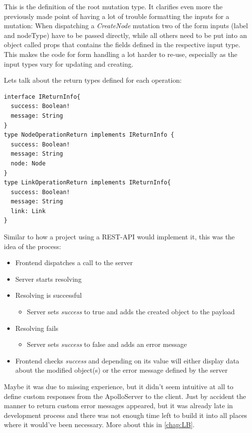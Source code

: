 This is the definition of the root mutation type. It clarifies even more the previously made point of having a lot of trouble formatting the inputs for a mutation: When dispatching a \emph{CreateNode} mutation two of the form inputs (label and nodeType) have to be passed directly, while all others need to be put into an object called props that contains the fields defined in the respective input type. This makes the code for form handling a lot harder to re-use, especially as the input types vary for updating and creating.

\newpage
Lets talk about the return types defined for each operation:
\begin{lstlisting}[caption={Return Types}]
interface IReturnInfo{
  success: Boolean!
  message: String
}
type NodeOperationReturn implements IReturnInfo {
  success: Boolean!
  message: String
  node: Node
}
type LinkOperationReturn implements IReturnInfo{
  success: Boolean!
  message: String
  link: Link
}
\end{lstlisting}
Similar to how a project using a REST-API would implement it, this was the idea of the process:
\begin{itemize}
\item Frontend dispatches a call to the server
\item Server starts resolving
\item Resolving is successful
	\begin{itemize}
		\item Server sets \emph{success} to true and adds the created object to the payload
	\end{itemize}
\item Resolving fails
	\begin{itemize}
		\item Server sets \emph{success} to false and adds an error message
	\end{itemize}

\item Frontend checks \emph{success} and depending on its value will either display data about the modified object(s) or the error message defined by the server
\end{itemize}

Maybe it was due to missing experience, but it didn't seem intuitive at all to define custom responses from the ApolloServer to the client. Just by accident the manner to return custom error messages appeared, but it was already late in development process and there was not enough time left to build it into all places where it would've been necessary. More about this in \autoref{chap:LB}.

